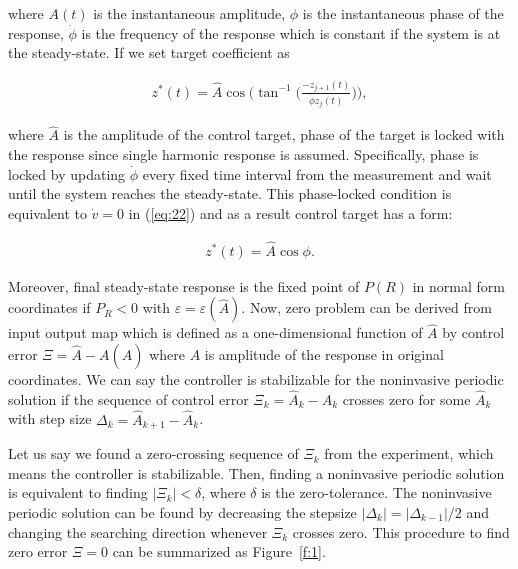 \documentclass[openacc]{rsproca_new}%
\def\epsilon{\varepsilon}
\newcommand{\Eref}[1]{(\ref{#1})}
\newcommand{\Fref}[1]{Figure~\ref{#1}}
\begin{document}
\noindent where $A(t)$ is the instantaneous amplitude, $\phi$ is the instantaneous phase of the response, $\dot\phi$ is the frequency of the response which is constant if the system is at the steady-state. If we set target coefficient as

\begin{align}\label{eq:26}
z^*(t)=\hat A\cos\Big(\tan^{-1}\Big({\frac{-z_{j+1}(t)}{ \dot \phi z_{j}(t)}}\Big) \Big),
\end{align}

\noindent where $\hat A$ is the amplitude of the control target, phase of the target is locked with the response since single harmonic response is assumed. Specifically, phase is locked by updating $\dot\phi$ every fixed time interval from the measurement and wait until the system reaches the steady-state. This phase-locked condition is equivalent to $\dot v=0$ in \Eref{eq:22} and as a result control target has a form:

\begin{align}\label{eq:tg}
 z^*(t)=\hat A\cos{\phi}.
\end{align}

\noindent Moreover, final steady-state response is the fixed point of $P(R)$ in normal form coordinates if $P_R<0$ with $\epsilon=\epsilon(\hat A)$. Now, zero problem can be derived from input output map which is defined as a one-dimensional function of $\hat A$ by control error $\Xi=\hat A - A(\hat A)$ where $A$ is amplitude of the response in original coordinates. We can say the controller is stabilizable for the noninvasive periodic solution if the sequence of control error $\Xi_k=\hat A_k-A_k$ crosses zero for some $\hat A_k$ with step size $\Delta_k=\hat A_{k+1}-\hat A_{k}$.

Let us say we found a zero-crossing sequence of $\Xi_k$ from the experiment, which means the controller is stabilizable. Then, finding a noninvasive periodic solution is equivalent to finding  $|\Xi_k|<\delta$, where $\delta$ is the zero-tolerance. The noninvasive periodic solution can be found by decreasing the stepsize $|\Delta_k|=|\Delta_{k-1}|/2$ and changing the searching direction whenever $\Xi_k$ crosses zero. This procedure to find zero error $\Xi=0$ can be summarized as \Fref{f:1}.
\end{document}
